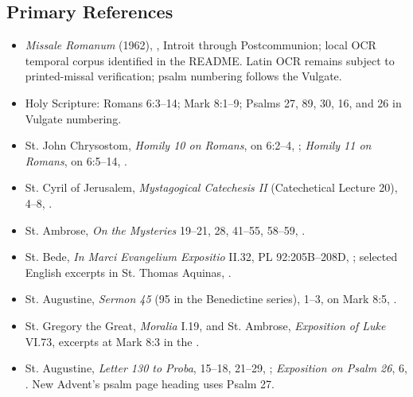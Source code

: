 \begin{deepstudy}
\section*{Primary References}
{\small
\begin{itemize}
\item \emph{Missale Romanum} (1962), , Introit through Postcommunion; local OCR temporal corpus identified in the README. Latin OCR remains subject to printed-missal verification; psalm numbering follows the Vulgate.
\item Holy Scripture: Romans 6:3--14; Mark 8:1--9; Psalms 27, 89, 30, 16, and 26 in Vulgate numbering.
\item St. John Chrysostom, \emph{Homily 10 on Romans}, on 6:2--4, ; \emph{Homily 11 on Romans}, on 6:5--14, .
\item St. Cyril of Jerusalem, \emph{Mystagogical Catechesis II} (Catechetical Lecture 20), 4--8, .
\item St. Ambrose, \emph{On the Mysteries} 19--21, 28, 41--55, 58--59, .
\item St. Bede, \emph{In Marci Evangelium Expositio} II.32, PL 92:205B--208D, ; selected English excerpts in St. Thomas Aquinas, .
\item St. Augustine, \emph{Sermon 45} (95 in the Benedictine series), 1--3, on Mark 8:5, .
\item St. Gregory the Great, \emph{Moralia} I.19, and St. Ambrose, \emph{Exposition of Luke} VI.73, excerpts at Mark 8:3 in the .
\item St. Augustine, \emph{Letter 130 to Proba}, 15--18, 21--29, ; \emph{Exposition on Psalm 26}, 6, . New Advent's psalm page heading uses Psalm 27.
\end{itemize}
}

\end{deepstudy}

